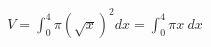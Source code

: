 \documentclass[preview]{standalone}
\begin{document}
\begin{align*}
V = \int_0^4 \pi (\sqrt{x})^2 dx = \int_0^4 \pi x\ dx
\end{align*}
\end{document}
